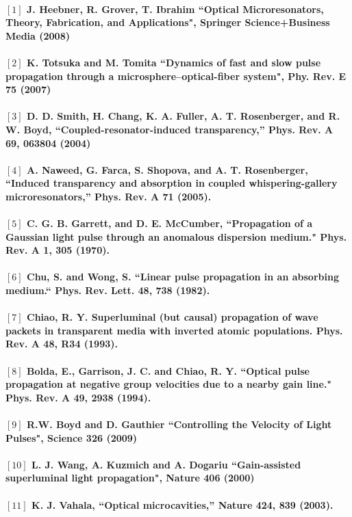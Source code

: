 \paragraph{\normalfont \large $[1]$ J. Heebner, R. Grover, T. Ibrahim “Optical Microresonators, Theory, Fabrication, and Applications", Springer Science+Business Media (2008)\\
\\ $[2]$ K. Totsuka and M. Tomita “Dynamics of fast and slow pulse propagation through a microsphere–optical-fiber system", Phy. Rev. E \textbf{75} (2007)\\
\\ $[3]$ D. D. Smith, H. Chang, K. A. Fuller, A. T. Rosenberger, and R. W. Boyd, “Coupled-resonator-induced
transparency,” Phys. Rev. A \textbf{69}, 063804 (2004)\\
\\ $[4]$ A. Naweed, G. Farca, S. Shopova, and A. T. Rosenberger, “Induced transparency and absorption in coupled
whispering-gallery microresonators,” Phys. Rev. A \textbf{71} (2005).\\
\\ $[5]$ C. G. B. Garrett, and D. E. McCumber,  “Propagation of a Gaussian light pulse through an anomalous dispersion medium." Phys. Rev. A \textbf{1}, 305 (1970).\\
\\ $[6]$ Chu, S. and Wong, S. “Linear pulse propagation in an absorbing medium.“ Phys. Rev. Lett. \textbf{48}, 738
(1982).\\
\\ $[7]$ Chiao, R. Y. Superluminal (but causal) propagation of wave packets in transparent media with inverted atomic populations. Phys. Rev. A \textbf{48}, R34 (1993).\\
\\ $[8]$ Bolda, E., Garrison, J. C. and Chiao, R. Y. “Optical pulse propagation at negative group velocities due to a nearby gain line." Phys. Rev. A \textbf{49}, 2938 (1994).\\
\\ $[9]$ R.W. Boyd and D. Gauthier “Controlling the Velocity of Light Pulses", Science \textbf{326} (2009)\\
\\ $[10]$ L. J. Wang, A. Kuzmich and A. Dogariu “Gain-assisted superluminal light propagation", Nature \textbf{406} (2000)\\
\\ $[11]$  K. J. Vahala, “Optical microcavities,” Nature \textbf{424}, 839 (2003).\\
}
